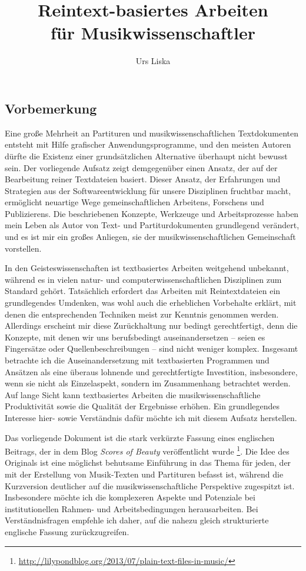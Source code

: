 \documentclass[DIV=12]{scrreprt}
\begin{document}
\title{Reintext-basiertes Arbeiten\\für Musikwissenschaftler}
\author{Urs Liska}
\maketitle

\subsection*{Vorbemerkung}
Eine große Mehrheit an Partituren und musikwissenschaftlichen Textdokumenten entsteht mit Hilfe grafischer Anwendungsprogramme, und den meisten Autoren dürfte die Existenz einer grundsätzlichen Alternative überhaupt nicht bewusst sein.
Der vorliegende Aufsatz zeigt demgegenüber einen Ansatz, der auf der Bearbeitung reiner Textdateien basiert.
Dieser Ansatz, der Erfahrungen und Strategien aus der Softwareentwicklung für unsere Disziplinen fruchtbar macht, ermöglicht neuartige Wege gemeinschaftlichen Arbeitens, Forschens und Publizierens.
Die beschriebenen Konzepte, Werkzeuge und Arbeitsprozesse haben mein Leben als Autor von Text- und Partiturdokumenten grundlegend verändert, und es ist mir ein großes Anliegen, sie der musikwissenschaftlichen Gemeinschaft vorstellen.

In den Geisteswissenschaften ist textbasiertes Arbeiten weitgehend unbekannt, während es in vielen natur- und computerwissenschaftlichen Disziplinen zum Standard gehört.
Tatsächlich erfordert das Arbeiten mit Reintextdateien ein grundlegendes Umdenken, was wohl auch die erheblichen Vorbehalte erklärt, mit denen die entsprechenden Techniken meist zur Kenntnis genommen werden.
Allerdings erscheint mir diese Zurückhaltung nur bedingt gerechtfertigt, denn die Konzepte, mit denen wir uns berufsbedingt auseinandersetzen -- seien es Fingersätze oder Quellenbeschreibungen -- sind nicht weniger komplex.
Insgesamt betrachte ich die Auseinandersetzung mit textbasierten Programmen und Ansätzen als eine überaus lohnende und gerechtfertigte Investition, insbesondere, wenn sie nicht als Einzelaspekt, sondern im Zusammenhang betrachtet werden.
Auf lange Sicht kann textbasiertes Arbeiten die musikwissenschaftliche Produktivität sowie die Qualität der Ergebnisse erhöhen.
Ein grundlegendes Interesse hier- sowie Verständnis dafür möchte ich mit diesem Aufsatz herstellen.

\medskip
Das vorliegende Dokument ist die stark verkürzte Fassung eines englischen Beitrags, der in dem Blog \emph{Scores of Beauty} veröffentlicht wurde%
\footnote{\url{http://lilypondblog.org/2013/07/plain-text-files-in-music/}}.
Die Idee des Originals ist eine möglichst behutsame Einführung in das Thema für jeden, der mit der Erstellung von Musik-Texten und Partituren befasst ist, während die Kurzversion deutlicher auf die musikwissenschaftliche Perspektive zugespitzt ist.
Insbesondere möchte ich die komplexeren Aspekte und Potenziale bei institutionellen Rahmen- und Arbeitsbedingungen herausarbeiten.
Bei Verständnisfragen empfehle ich daher, auf die nahezu gleich strukturierte englische 
Fassung zurückzugreifen.
\end{document}
